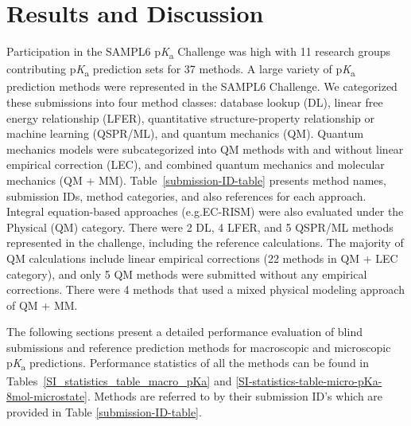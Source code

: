 \documentclass[9pt,lineno,final]{elife}
\newcommand{\pKa}{p\textit{K}\textsubscript{a}}
\begin{document}
\section{Results and Discussion}


Participation in the SAMPL6 \pKa{} Challenge was high with 11 research groups contributing \pKa{} prediction sets for 37 methods.  
A large variety of \pKa{} prediction methods were represented in the SAMPL6 Challenge. 
We categorized these submissions into four method classes: database lookup (DL), linear free energy relationship (LFER), quantitative structure-property relationship or machine learning (QSPR/ML), and quantum mechanics (QM). 
Quantum mechanics models were subcategorized into QM methods with and without linear empirical correction (LEC), and combined quantum mechanics and molecular mechanics (QM + MM). 
Table~\ref{submission-ID-table} presents method names, submission IDs, method categories, and also references for each approach. 
Integral equation-based approaches (e.g.EC-RISM) were also evaluated under the Physical (QM) category. 
There were 2 DL, 4 LFER, and 5 QSPR/ML methods represented in the challenge, including the reference calculations. 
The majority of QM calculations include linear empirical corrections (22 methods in QM + LEC category), and only 5 QM methods were submitted without any empirical corrections. 
There were 4 methods that used a mixed physical modeling approach of QM + MM. 

The following sections present a detailed performance evaluation of blind submissions and reference prediction methods for macroscopic and microscopic \pKa{} predictions. 
Performance statistics of all the methods can be found in Tables~\ref{SI_statistics_table_macro_pKa} and \ref{SI-statistics-table-micro-pKa-8mol-microstate}. 
Methods are referred to by their submission ID's which are provided in Table \ref{submission-ID-table}.
\end{document}
